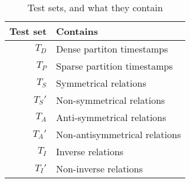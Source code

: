 \begin{table}[htb]
\centering
\begin{minipage}{0.95\columnwidth}
\centering
\caption{Test sets, and what they contain}
\vspace{-3mm}

\begin{tabular}{r|l}\hline
Test set & Contains \\ \hline
$T_D$ & Dense partiton timestamps \\ 
$T_P$ & Sparse partition timestamps \\
$T_S$ & Symmetrical relations \\ 
$T_S'$ & Non-symmetrical relations \\ 
$T_A$ & Anti-symmetrical relations \\ 
$T_A'$ & Non-antisymmetrical relations \\ 
$T_I$ & Inverse relations \\ 
$T_I'$ & Non-inverse relations \\ \hline
\end{tabular}

\label{tab:test_set_explanations}
\end{minipage}
\end{table}

